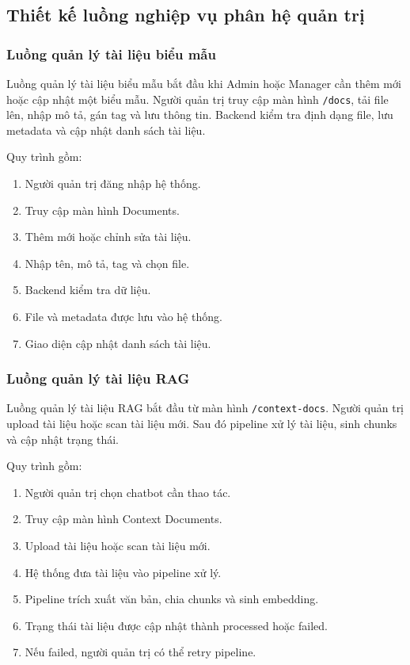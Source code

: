 \subsection{Thiết kế luồng nghiệp vụ phân hệ quản trị}

\subsubsection{Luồng quản lý tài liệu biểu mẫu}

Luồng quản lý tài liệu biểu mẫu bắt đầu khi Admin hoặc Manager cần thêm mới hoặc cập nhật một biểu mẫu. Người quản trị truy cập màn hình \texttt{/docs}, tải file lên, nhập mô tả, gán tag và lưu thông tin. Backend kiểm tra định dạng file, lưu metadata và cập nhật danh sách tài liệu.

Quy trình gồm:

\begin{enumerate}
    \item Người quản trị đăng nhập hệ thống.
    \item Truy cập màn hình Documents.
    \item Thêm mới hoặc chỉnh sửa tài liệu.
    \item Nhập tên, mô tả, tag và chọn file.
    \item Backend kiểm tra dữ liệu.
    \item File và metadata được lưu vào hệ thống.
    \item Giao diện cập nhật danh sách tài liệu.
\end{enumerate}

\subsubsection{Luồng quản lý tài liệu RAG}

Luồng quản lý tài liệu RAG bắt đầu từ màn hình \texttt{/context-docs}. Người quản trị upload tài liệu hoặc scan tài liệu mới. Sau đó pipeline xử lý tài liệu, sinh chunks và cập nhật trạng thái.

Quy trình gồm:

\begin{enumerate}
    \item Người quản trị chọn chatbot cần thao tác.
    \item Truy cập màn hình Context Documents.
    \item Upload tài liệu hoặc scan tài liệu mới.
    \item Hệ thống đưa tài liệu vào pipeline xử lý.
    \item Pipeline trích xuất văn bản, chia chunks và sinh embedding.
    \item Trạng thái tài liệu được cập nhật thành processed hoặc failed.
    \item Nếu failed, người quản trị có thể retry pipeline.
\end{enumerate}

